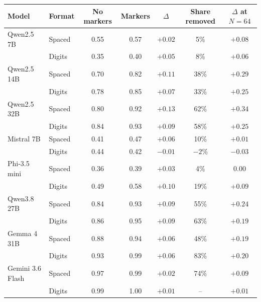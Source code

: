 \begin{tabular}{ll cc c c c}
\toprule
Model & Format & No markers & Markers & $\Delta$ & Share removed & $\Delta$ at $N = 64$ \\
\midrule
Qwen2.5 7B & Spaced & 0.55 & 0.57 & $+0.02$ & 5\% & $+0.08$ \\
 & Digits & 0.35 & 0.40 & $+0.05$ & 8\% & $+0.06$ \\
Qwen2.5 14B & Spaced & 0.70 & 0.82 & $+0.11$ & 38\% & $+0.29$ \\
 & Digits & 0.78 & 0.85 & $+0.07$ & 33\% & $+0.25$ \\
Qwen2.5 32B & Spaced & 0.80 & 0.92 & $+0.13$ & 62\% & $+0.34$ \\
 & Digits & 0.84 & 0.93 & $+0.09$ & 58\% & $+0.25$ \\
Mistral 7B & Spaced & 0.41 & 0.47 & $+0.06$ & 10\% & $+0.01$ \\
 & Digits & 0.44 & 0.42 & $-0.01$ & $-2\%$ & $-0.03$ \\
Phi-3.5 mini & Spaced & 0.36 & 0.39 & $+0.03$ & 4\% & $0.00$ \\
 & Digits & 0.49 & 0.58 & $+0.10$ & 19\% & $+0.09$ \\
Qwen3.8 27B & Spaced & 0.84 & 0.93 & $+0.09$ & 55\% & $+0.24$ \\
 & Digits & 0.86 & 0.95 & $+0.09$ & 63\% & $+0.19$ \\
Gemma 4 31B & Spaced & 0.88 & 0.94 & $+0.06$ & 48\% & $+0.19$ \\
 & Digits & 0.93 & 0.99 & $+0.06$ & 83\% & $+0.20$ \\
Gemini 3.6 Flash & Spaced & 0.97 & 0.99 & $+0.02$ & 74\% & $+0.09$ \\
 & Digits & 0.99 & 1.00 & $+0.01$ & -- & $+0.01$ \\
\bottomrule
\end{tabular}
